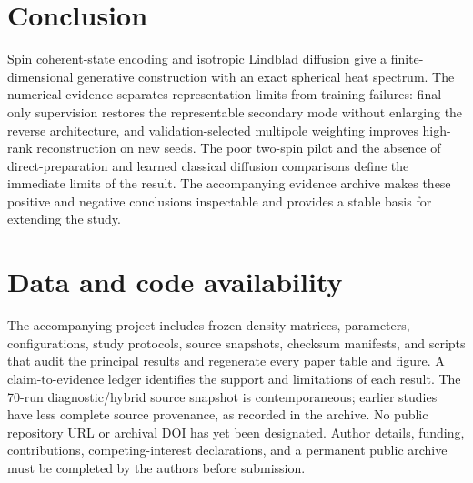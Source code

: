 \section{Conclusion}
Spin coherent-state encoding and isotropic Lindblad diffusion give a finite-dimensional generative construction with an exact spherical heat spectrum. The numerical evidence separates representation limits from training failures: final-only supervision restores the representable secondary mode without enlarging the reverse architecture, and validation-selected multipole weighting improves high-rank reconstruction on new seeds. The poor two-spin pilot and the absence of direct-preparation and learned classical diffusion comparisons define the immediate limits of the result. The accompanying evidence archive makes these positive and negative conclusions inspectable and provides a stable basis for extending the study.

\section*{Data and code availability}
The accompanying project includes frozen density matrices, parameters, configurations, study protocols, source snapshots, checksum manifests, and scripts that audit the principal results and regenerate every paper table and figure. A claim-to-evidence ledger identifies the support and limitations of each result. The 70-run diagnostic/hybrid source snapshot is contemporaneous; earlier studies have less complete source provenance, as recorded in the archive. No public repository URL or archival DOI has yet been designated. Author details, funding, contributions, competing-interest declarations, and a permanent public archive must be completed by the authors before submission.
